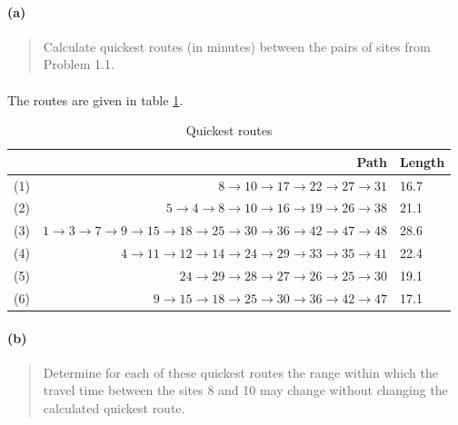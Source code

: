 \paragraph{(a)}
\begin{quote}
Calculate quickest routes (in minutes) between the pairs of sites from Problem 1.1.
\end{quote}

\paragraph{}
The routes are given in table \ref{quickest_routes_12}.

\begin{table}[H]
\centering
\begin{tabular}{|c|r|l|}
\hline
 & Path & Length \\ \hline
(1) & $ 8 \rightarrow 10 \rightarrow 17 \rightarrow 22 \rightarrow 27 \rightarrow 31 $ & 16.7 \\ \hline
(2) & $ 5 \rightarrow 4 \rightarrow 8 \rightarrow 10 \rightarrow 16 \rightarrow 19 \rightarrow 26 \rightarrow 38 $ & 21.1 \\ \hline
(3) & $ 1 \rightarrow 3 \rightarrow 7 \rightarrow 9 \rightarrow 15 \rightarrow 18 \rightarrow 25 \rightarrow 30 \rightarrow 36 \rightarrow 42 \rightarrow 47 \rightarrow 48 $ & 28.6 \\ \hline
(4) & $ 4 \rightarrow 11 \rightarrow 12 \rightarrow 14 \rightarrow 24 \rightarrow 29 \rightarrow 33 \rightarrow 35 \rightarrow 41 $ & 22.4 \\ \hline
(5) & $ 24 \rightarrow 29 \rightarrow 28 \rightarrow 27 \rightarrow 26 \rightarrow 25 \rightarrow 30 $ & 19.1 \\ \hline
(6) & $ 9 \rightarrow 15 \rightarrow 18 \rightarrow 25 \rightarrow 30 \rightarrow 36 \rightarrow 42 \rightarrow 47 $ & 17.1 \\ \hline
\end{tabular}
\caption{Quickest routes}
\label{quickest_routes_12}
\end{table}

\paragraph{(b)}
\begin{quote}
Determine for each of these quickest routes the range within which the travel time between the sites 8 and 10 may change without changing the calculated quickest route.
\end{quote}

